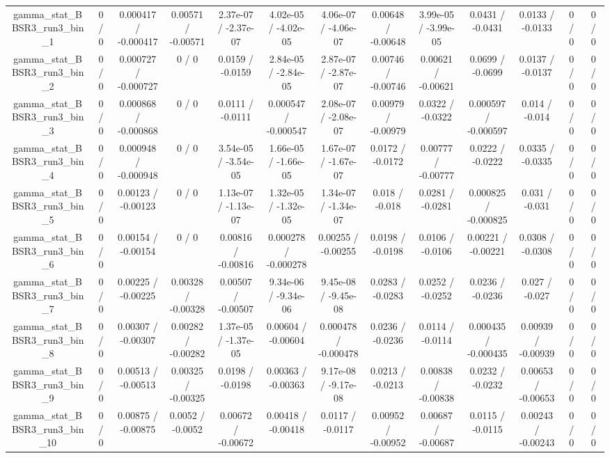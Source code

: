 \documentclass[10pt]{article}
\begin{document}
\begin{table}[htbp]
\begin{center}
\begin{tabular}{|c|c|c|c|c|c|c|c|c|c|c|c|c|}
  gamma_stat_BBSR3_run3_bin_1 & 0 / 0 & 0.000417 / -0.000417 & 0.00571 / -0.00571 & 2.37e-07 / -2.37e-07 & 4.02e-05 / -4.02e-05 & 4.06e-07 / -4.06e-07 & 0.00648 / -0.00648 & 3.99e-05 / -3.99e-05 & 0.0431 / -0.0431 & 0.0133 / -0.0133 & 0 / 0 & 0 / 0 \\ 
  gamma_stat_BBSR3_run3_bin_2 & 0 / 0 & 0.000727 / -0.000727 & 0 / 0 & 0.0159 / -0.0159 & 2.84e-05 / -2.84e-05 & 2.87e-07 / -2.87e-07 & 0.00746 / -0.00746 & 0.00621 / -0.00621 & 0.0699 / -0.0699 & 0.0137 / -0.0137 & 0 / 0 & 0 / 0 \\ 
  gamma_stat_BBSR3_run3_bin_3 & 0 / 0 & 0.000868 / -0.000868 & 0 / 0 & 0.0111 / -0.0111 & 0.000547 / -0.000547 & 2.08e-07 / -2.08e-07 & 0.00979 / -0.00979 & 0.0322 / -0.0322 & 0.000597 / -0.000597 & 0.014 / -0.014 & 0 / 0 & 0 / 0 \\ 
  gamma_stat_BBSR3_run3_bin_4 & 0 / 0 & 0.000948 / -0.000948 & 0 / 0 & 3.54e-05 / -3.54e-05 & 1.66e-05 / -1.66e-05 & 1.67e-07 / -1.67e-07 & 0.0172 / -0.0172 & 0.00777 / -0.00777 & 0.0222 / -0.0222 & 0.0335 / -0.0335 & 0 / 0 & 0 / 0 \\ 
  gamma_stat_BBSR3_run3_bin_5 & 0 / 0 & 0.00123 / -0.00123 & 0 / 0 & 1.13e-07 / -1.13e-07 & 1.32e-05 / -1.32e-05 & 1.34e-07 / -1.34e-07 & 0.018 / -0.018 & 0.0281 / -0.0281 & 0.000825 / -0.000825 & 0.031 / -0.031 & 0 / 0 & 0 / 0 \\ 
  gamma_stat_BBSR3_run3_bin_6 & 0 / 0 & 0.00154 / -0.00154 & 0 / 0 & 0.00816 / -0.00816 & 0.000278 / -0.000278 & 0.00255 / -0.00255 & 0.0198 / -0.0198 & 0.0106 / -0.0106 & 0.00221 / -0.00221 & 0.0308 / -0.0308 & 0 / 0 & 0 / 0 \\ 
  gamma_stat_BBSR3_run3_bin_7 & 0 / 0 & 0.00225 / -0.00225 & 0.00328 / -0.00328 & 0.00507 / -0.00507 & 9.34e-06 / -9.34e-06 & 9.45e-08 / -9.45e-08 & 0.0283 / -0.0283 & 0.0252 / -0.0252 & 0.0236 / -0.0236 & 0.027 / -0.027 & 0 / 0 & 0 / 0 \\ 
  gamma_stat_BBSR3_run3_bin_8 & 0 / 0 & 0.00307 / -0.00307 & 0.00282 / -0.00282 & 1.37e-05 / -1.37e-05 & 0.00604 / -0.00604 & 0.000478 / -0.000478 & 0.0236 / -0.0236 & 0.0114 / -0.0114 & 0.000435 / -0.000435 & 0.00939 / -0.00939 & 0 / 0 & 0 / 0 \\ 
  gamma_stat_BBSR3_run3_bin_9 & 0 / 0 & 0.00513 / -0.00513 & 0.00325 / -0.00325 & 0.0198 / -0.0198 & 0.00363 / -0.00363 & 9.17e-08 / -9.17e-08 & 0.0213 / -0.0213 & 0.00838 / -0.00838 & 0.0232 / -0.0232 & 0.00653 / -0.00653 & 0 / 0 & 0 / 0 \\ 
  gamma_stat_BBSR3_run3_bin_10 & 0 / 0 & 0.00875 / -0.00875 & 0.0052 / -0.0052 & 0.00672 / -0.00672 & 0.00418 / -0.00418 & 0.0117 / -0.0117 & 0.00952 / -0.00952 & 0.00687 / -0.00687 & 0.0115 / -0.0115 & 0.00243 / -0.00243 & 0 / 0 & 0 / 0 \\ 

\end{tabular}
\end{center}
\end{table}
\end{document}
